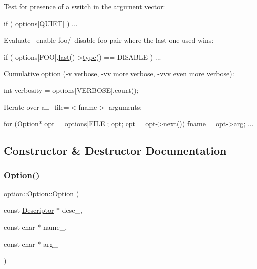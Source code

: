 \begin{DoxyItemize}
\item Test for presence of a switch in the argument vector\+: 
\begin{DoxyCode}
\textcolor{keywordflow}{if} ( options[QUIET] ) ... 
\end{DoxyCode}
 \item Evaluate --enable-\/foo/--disable-\/foo pair where the last one used wins\+: 
\begin{DoxyCode}
\textcolor{keywordflow}{if} ( options[FOO].\hyperlink{classoption_1_1Option_afe2aff68191e55b59c53fac3dbbcd7c3}{last}()->\hyperlink{classoption_1_1Option_a5268a69e1a91137186ab772574296da0}{type}() == DISABLE ) ... 
\end{DoxyCode}
 \item Cumulative option (-\/v verbose, -\/vv more verbose, -\/vvv even more verbose)\+: 
\begin{DoxyCode}
\textcolor{keywordtype}{int} verbosity = options[VERBOSE].count(); 
\end{DoxyCode}
 \item Iterate over all --file=$<$fname$>$ arguments\+: 
\begin{DoxyCode}
\textcolor{keywordflow}{for} (\hyperlink{classoption_1_1Option_aa2810152fc23b14175b115d1a7d38095}{Option}* opt = options[FILE]; opt; opt = opt->next())
 fname = opt->arg; ... 
\end{DoxyCode}
 \end{DoxyItemize}


\subsection{Constructor \& Destructor Documentation}
\mbox{\label{classoption_1_1Option_a385221e2a8f37c548f0d5777bfddb216}} 
\subsubsection{\texorpdfstring{Option()}{Option()}\hspace{0.1cm}{\footnotesize\ttfamily [1/2]}}
{\footnotesize\ttfamily option\+::\+Option\+::\+Option (\begin{DoxyParamCaption}\item[{const \hyperlink{structoption_1_1Descriptor}{Descriptor} $\ast$}]{desc\+\_\+,  }\item[{const char $\ast$}]{name\+\_\+,  }\item[{const char $\ast$}]{arg\+\_\+ }\end{DoxyParamCaption})\hspace{0.3cm}{\ttfamily [inline]}}



